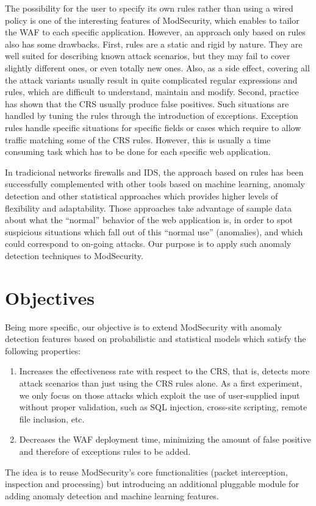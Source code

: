 \documentclass[runningheads,a4paper]{llncs}
\begin{document}
The possibility for the user to specify its own rules rather than using a wired policy is one of the interesting features of ModSecurity, which enables to tailor the WAF to each specific application. However, an approach only based on rules also has some drawbacks. First, rules are a static and rigid by nature. They are well suited for describing known attack scenarios, but they may fail to cover slightly different ones, or even totally new ones. Also, as a side effect, covering all the attack variants usually result in quite complicated regular expressions and rules, which are difficult to understand, maintain and modify. Second, practice has shown that the CRS usually produce false positives. Such situations are handled by tuning the rules through the introduction of exceptions. Exception rules handle specific situations for specific fields or cases which require to allow traffic matching some of the CRS rules. However, this is usually a time consuming task which has to be done for each specific web application.

In tradicional networks firewalls and IDS, the approach based on rules has been successfully complemented with other tools based on machine learning, anomaly detection and other statistical approaches which provides higher levels of flexibility and adaptability. Those approaches take advantage of sample data about what the “normal” behavior of the web application is, in order to spot suspicious situations which fall out of this “normal use” (anomalies), and which could correspond to on-going attacks. Our purpose is to apply such anomaly detection techniques to ModSecurity.

\section{Objectives}


Being more specific, our objective is to extend ModSecurity with anomaly detection features based on probabilistic and statistical models which satisfy the following properties:
\begin{enumerate}
\item Increases the effectiveness rate with respect to the CRS, that is, detects more attack scenarios than just using the CRS rules alone. As a first experiment, we only focus on those attacks which exploit the use of user-supplied input without proper validation, such as SQL injection, cross-site scripting, remote file inclusion, etc. 
\item Decreases the WAF deployment time, minimizing the amount of false positive and therefore of exceptions rules to be added.
\end{enumerate}
The idea is to reuse ModSecurity’s core functionalities (packet interception, inspection and processing) but introducing an additional pluggable module for adding anomaly detection and machine learning features.
\end{document}
